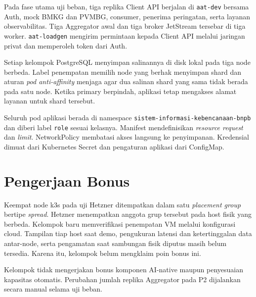 

Pada fase utama uji beban, tiga replika Client API berjalan di \texttt{aat-dev} bersama Auth, mock BMKG dan PVMBG, consumer, penerima peringatan, serta layanan observabilitas. Tiga Aggregator awal dan tiga broker JetStream tersebar di tiga worker. \texttt{aat-loadgen} mengirim permintaan kepada Client API melalui jaringan privat dan memperoleh token dari Auth.

Setiap kelompok PostgreSQL menyimpan salinannya di disk lokal pada tiga node berbeda. Label penempatan memilih node yang berhak menyimpan shard dan aturan \textit{pod anti-affinity} menjaga agar dua salinan shard yang sama tidak berada pada satu node. Ketika primary berpindah, aplikasi tetap mengakses alamat layanan untuk shard tersebut.

Seluruh pod aplikasi berada di namespace \texttt{sistem-informasi-kebencanaan-bnpb} dan diberi label \texttt{role} sesuai kelasnya. Manifest mendefinisikan \textit{resource request} dan \textit{limit}. NetworkPolicy membatasi akses langsung ke penyimpanan. Kredensial dimuat dari Kubernetes Secret dan pengaturan aplikasi dari ConfigMap.

\section{Pengerjaan Bonus}

Keempat node k3s pada uji Hetzner ditempatkan dalam satu \textit{placement group} bertipe \textit{spread}. Hetzner menempatkan anggota grup tersebut pada host fisik yang berbeda\cite{hetzner-placement}. Kelompok baru memverifikasi penempatan VM melalui konfigurasi cloud. Tampilan tiap host saat demo, pengukuran latensi dan ketertinggalan data antar-node, serta pengamatan saat sambungan fisik diputus masih belum tersedia. Karena itu, kelompok belum mengklaim poin bonus ini.

Kelompok tidak mengerjakan bonus komponen AI-native maupun penyesuaian kapasitas otomatis. Perubahan jumlah replika Aggregator pada P2 dijalankan secara manual selama uji beban.
